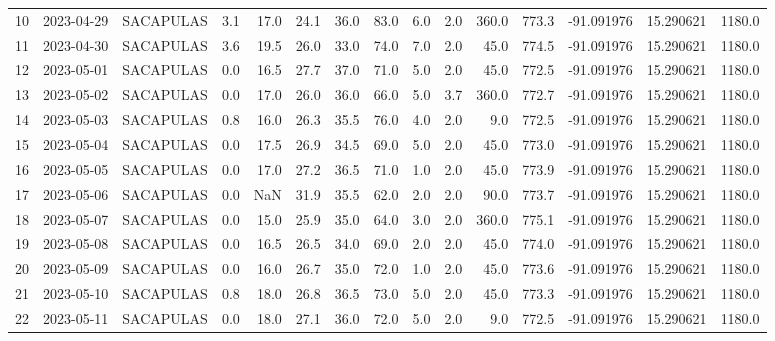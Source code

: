 \documentclass[12pt]{article}
\begin{document}
\begin{center}
\begin{tabular}{lllrrrrrrrrrrrr}
10  & 2023-04-29 &  SACAPULAS &     3.1 &  17.0 &   24.1 &  36.0 &     83.0 &  6.0 &         2.0 &       360.0 &      773.3 & -91.091976 &  15.290621 &   1180.0 \\
11  & 2023-04-30 &  SACAPULAS &     3.6 &  19.5 &   26.0 &  33.0 &     74.0 &  7.0 &         2.0 &        45.0 &      774.5 & -91.091976 &  15.290621 &   1180.0 \\
12  & 2023-05-01 &  SACAPULAS &     0.0 &  16.5 &   27.7 &  37.0 &     71.0 &  5.0 &         2.0 &        45.0 &      772.5 & -91.091976 &  15.290621 &   1180.0 \\
13  & 2023-05-02 &  SACAPULAS &     0.0 &  17.0 &   26.0 &  36.0 &     66.0 &  5.0 &         3.7 &       360.0 &      772.7 & -91.091976 &  15.290621 &   1180.0 \\
14  & 2023-05-03 &  SACAPULAS &     0.8 &  16.0 &   26.3 &  35.5 &     76.0 &  4.0 &         2.0 &         9.0 &      772.5 & -91.091976 &  15.290621 &   1180.0 \\
15  & 2023-05-04 &  SACAPULAS &     0.0 &  17.5 &   26.9 &  34.5 &     69.0 &  5.0 &         2.0 &        45.0 &      773.0 & -91.091976 &  15.290621 &   1180.0 \\
16  & 2023-05-05 &  SACAPULAS &     0.0 &  17.0 &   27.2 &  36.5 &     71.0 &  1.0 &         2.0 &        45.0 &      773.9 & -91.091976 &  15.290621 &   1180.0 \\
17  & 2023-05-06 &  SACAPULAS &     0.0 &   NaN &   31.9 &  35.5 &     62.0 &  2.0 &         2.0 &        90.0 &      773.7 & -91.091976 &  15.290621 &   1180.0 \\
18  & 2023-05-07 &  SACAPULAS &     0.0 &  15.0 &   25.9 &  35.0 &     64.0 &  3.0 &         2.0 &       360.0 &      775.1 & -91.091976 &  15.290621 &   1180.0 \\
19  & 2023-05-08 &  SACAPULAS &     0.0 &  16.5 &   26.5 &  34.0 &     69.0 &  2.0 &         2.0 &        45.0 &      774.0 & -91.091976 &  15.290621 &   1180.0 \\
20  & 2023-05-09 &  SACAPULAS &     0.0 &  16.0 &   26.7 &  35.0 &     72.0 &  1.0 &         2.0 &        45.0 &      773.6 & -91.091976 &  15.290621 &   1180.0 \\
21  & 2023-05-10 &  SACAPULAS &     0.8 &  18.0 &   26.8 &  36.5 &     73.0 &  5.0 &         2.0 &        45.0 &      773.3 & -91.091976 &  15.290621 &   1180.0 \\
22  & 2023-05-11 &  SACAPULAS &     0.0 &  18.0 &   27.1 &  36.0 &     72.0 &  5.0 &         2.0 &         9.0 &      772.5 & -91.091976 &  15.290621 &   1180.0 \\

\end{tabular}
\end{center}
\end{document}
